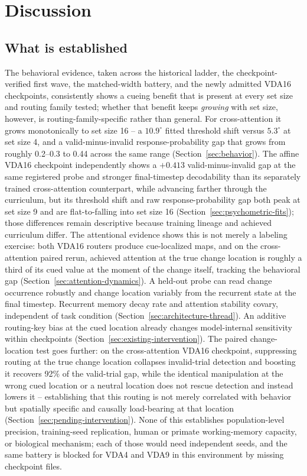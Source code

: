 \documentclass[11pt,a4paper]{article}
\begin{document}
\section{Discussion}\label{sec:discussion}
\subsection{What is established}
The behavioral evidence, taken across the historical ladder, the checkpoint-verified first wave, the matched-width battery, and the newly admitted VDA16 checkpoints, consistently shows a cueing benefit that is present at every set size and routing family tested; whether that benefit keeps \emph{growing} with set size, however, is routing-family-specific rather than general. For cross-attention it grows monotonically to set size 16 -- a $10.9^\circ$ fitted threshold shift versus $5.3^\circ$ at set size 4, and a valid-minus-invalid response-probability gap that grows from roughly 0.2--0.3 to 0.44 across the same range (Section~\ref{sec:behavior}). The affine VDA16 checkpoint independently shows a $+0.413$ valid-minus-invalid gap at the same registered probe and stronger final-timestep decodability than its separately trained cross-attention counterpart, while advancing farther through the curriculum, but its threshold shift and raw response-probability gap both peak at set size 9 and are flat-to-falling into set size 16 (Section~\ref{sec:psychometric-fits}); those differences remain descriptive because training lineage and achieved curriculum differ. The attentional evidence shows this is not merely a labeling exercise: both VDA16 routers produce cue-localized maps, and on the cross-attention paired rerun, achieved attention at the true change location is roughly a third of its cued value at the moment of the change itself, tracking the behavioral gap (Section~\ref{sec:attention-dynamics}). A held-out probe can read change occurrence robustly and change location variably from the recurrent state at the final timestep. Recurrent memory decay rate and attention stability covary, independent of task condition (Section~\ref{sec:architecture-thread}). An additive routing-key bias at the cued location already changes model-internal sensitivity within checkpoints (Section~\ref{sec:existing-intervention}). The paired change-location test goes further: on the cross-attention VDA16 checkpoint, suppressing routing at the true change location collapses invalid-trial detection and boosting it recovers 92\% of the valid-trial gap, while the identical manipulation at the wrong cued location or a neutral location does not rescue detection and instead lowers it -- establishing that this routing is not merely correlated with behavior but spatially specific and causally load-bearing at that location (Section~\ref{sec:pending-intervention}). None of this establishes population-level precision, training-seed replication, human or primate working-memory capacity, or biological mechanism; each of those would need independent seeds, and the same battery is blocked for VDA4 and VDA9 in this environment by missing checkpoint files.
\end{document}
